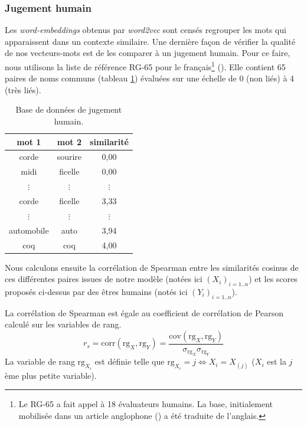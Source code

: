 \documentclass[11pt,french,french]{article}
\let\rmarkdownfootnote\footnote%
\def\footnote{\protect\rmarkdownfootnote}
\begin{document}
\hypertarget{sec:jugementHumain}{%
\subsubsection{Jugement humain}\label{sec:jugementHumain}}

Les \emph{word-embeddings} obtenus par \emph{word2vec} sont censés regrouper les mots qui apparaissent dans un contexte similaire.
Une dernière façon de vérifier la qualité de nos vecteurs-mots est de les comparer à un jugement humain. Pour ce faire, nous utilisons la liste de référence RG-65 pour le français\footnote{Le RG-65 a fait appel à 18 évaluateurs humains. La base, initialement mobilisée dans un article anglophone (\cite{Rubenstein}) a été traduite de l'anglais.} (\cite{Boumedyen}).
Elle contient 65 paires de noms communs (tableau \ref{table:human_judgement}) évaluées sur une échelle de 0 (non liés) à 4 (très liés).

\begin{table}[!h]
\begin{center}
\begin{tabular}{|c|c|c|}
    \hline
    mot 1 & mot 2 & similarité  \tabularnewline
    \hline
    corde & sourire & 0,00   \tabularnewline
    midi & ficelle & 0,00   \tabularnewline
    $\vdots$  & $\vdots$  & $\vdots$    \tabularnewline
    corde & ficelle & 3,33   \tabularnewline
    $\vdots$  & $\vdots$  & $\vdots$    \tabularnewline
    automobile & auto & 3,94   \tabularnewline
    coq & coq & 4,00   \tabularnewline
    \hline
 \end{tabular}
\captionsetup{margin=0cm,format=hang,justification=justified}
\caption{Base de données de jugement humain.}\label{table:human_judgement}
\end{center}
\end{table}

Nous calculons ensuite la corrélation de Spearman entre les similarités cosinus de ces différentes paires issues de notre modèle (notées ici \((X_i)_{i=1..n}\)) et les scores proposés ci-dessus par des êtres humains (notés ici \((Y_i)_{i=1..n}\)).

La corrélation de Spearman est égale au coefficient de corrélation de Pearson calculé sur les variables de rang.
\[
r_s = \mathrm{corr}(\mathrm{rg}_X, \mathrm{rg}_Y) = 
\frac{\mathrm{cov}(\mathrm{rg}_X, \mathrm{rg}_Y)}{
\sigma_{\mathrm{rg}_X} \sigma_{\mathrm{rg}_Y}
}
\]
La variable de rang \(\mathrm{rg}_{X_i}\) est définie telle que \(\mathrm{rg}_{X_i}=j \iff X_i = X_{(j)}\) (\(X_i\) est la \(j\)ème plus petite variable).
\end{document}
